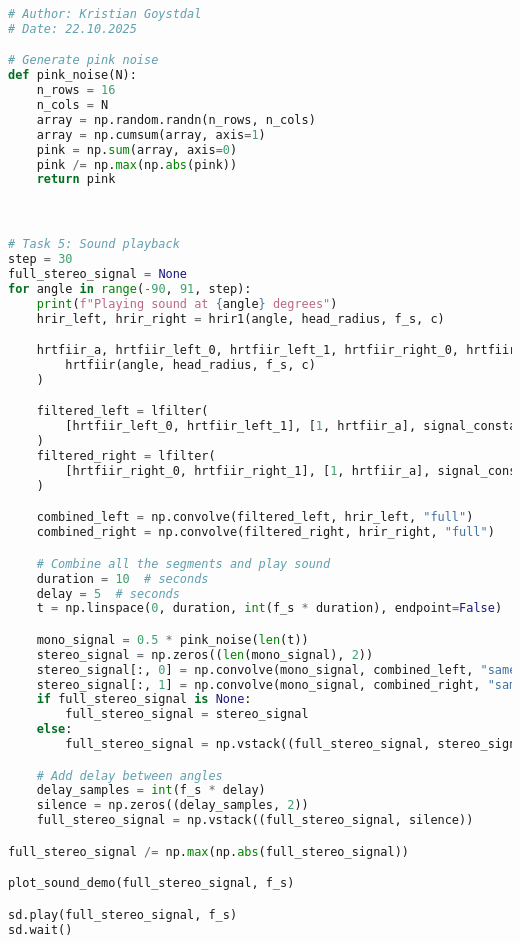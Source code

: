 \begin{lstlisting}[language=Python, caption={Excerpt from main.py}, label={lst:sound_demo}]
# Author: Kristian Goystdal
# Date: 22.10.2025

# Generate pink noise
def pink_noise(N):
    n_rows = 16
    n_cols = N
    array = np.random.randn(n_rows, n_cols)
    array = np.cumsum(array, axis=1)
    pink = np.sum(array, axis=0)
    pink /= np.max(np.abs(pink))
    return pink



# Task 5: Sound playback
step = 30
full_stereo_signal = None
for angle in range(-90, 91, step):
    print(f"Playing sound at {angle} degrees")
    hrir_left, hrir_right = hrir1(angle, head_radius, f_s, c)

    hrtfiir_a, hrtfiir_left_0, hrtfiir_left_1, hrtfiir_right_0, hrtfiir_right_1 = (
        hrtfiir(angle, head_radius, f_s, c)
    )

    filtered_left = lfilter(
        [hrtfiir_left_0, hrtfiir_left_1], [1, hrtfiir_a], signal_constant
    )
    filtered_right = lfilter(
        [hrtfiir_right_0, hrtfiir_right_1], [1, hrtfiir_a], signal_constant
    )

    combined_left = np.convolve(filtered_left, hrir_left, "full")
    combined_right = np.convolve(filtered_right, hrir_right, "full")

    # Combine all the segments and play sound
    duration = 10  # seconds
    delay = 5  # seconds
    t = np.linspace(0, duration, int(f_s * duration), endpoint=False)

    mono_signal = 0.5 * pink_noise(len(t))
    stereo_signal = np.zeros((len(mono_signal), 2))
    stereo_signal[:, 0] = np.convolve(mono_signal, combined_left, "same")
    stereo_signal[:, 1] = np.convolve(mono_signal, combined_right, "same")
    if full_stereo_signal is None:
        full_stereo_signal = stereo_signal
    else:
        full_stereo_signal = np.vstack((full_stereo_signal, stereo_signal))

    # Add delay between angles
    delay_samples = int(f_s * delay)
    silence = np.zeros((delay_samples, 2))
    full_stereo_signal = np.vstack((full_stereo_signal, silence))

full_stereo_signal /= np.max(np.abs(full_stereo_signal))

plot_sound_demo(full_stereo_signal, f_s)

sd.play(full_stereo_signal, f_s)
sd.wait()

\end{lstlisting}

